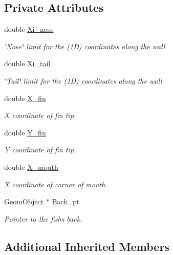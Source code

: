 \subsection*{Private Attributes}
\begin{DoxyCompactItemize}
\item 
double \hyperlink{classoomph_1_1FishDomain_af85c4be86bb87528939778e3f63a40a5}{Xi\+\_\+nose}
\begin{DoxyCompactList}\small\item\em \char`\"{}\+Nose\char`\"{} limit for the (1D) coordinates along the wall \end{DoxyCompactList}\item 
double \hyperlink{classoomph_1_1FishDomain_a38633d4f3e2777be9544b907d1de5870}{Xi\+\_\+tail}
\begin{DoxyCompactList}\small\item\em \char`\"{}\+Tail\char`\"{} limit for the (1D) coordinates along the wall \end{DoxyCompactList}\item 
double \hyperlink{classoomph_1_1FishDomain_af27c51fe0272df3dec2ad93c5c231d59}{X\+\_\+fin}
\begin{DoxyCompactList}\small\item\em X coordinate of fin tip. \end{DoxyCompactList}\item 
double \hyperlink{classoomph_1_1FishDomain_a162b4a35d8d0e986d254651571844253}{Y\+\_\+fin}
\begin{DoxyCompactList}\small\item\em Y coordinate of fin tip. \end{DoxyCompactList}\item 
double \hyperlink{classoomph_1_1FishDomain_aa25f3280c2453dd725d59f23a478ee11}{X\+\_\+mouth}
\begin{DoxyCompactList}\small\item\em X coordinate of corner of mouth. \end{DoxyCompactList}\item 
\hyperlink{classoomph_1_1GeomObject}{Geom\+Object} $\ast$ \hyperlink{classoomph_1_1FishDomain_ae943e7fe48ce09dded2d5351ab980f93}{Back\+\_\+pt}
\begin{DoxyCompactList}\small\item\em Pointer to the fish\textquotesingle{}s back. \end{DoxyCompactList}\end{DoxyCompactItemize}
\subsection*{Additional Inherited Members}


